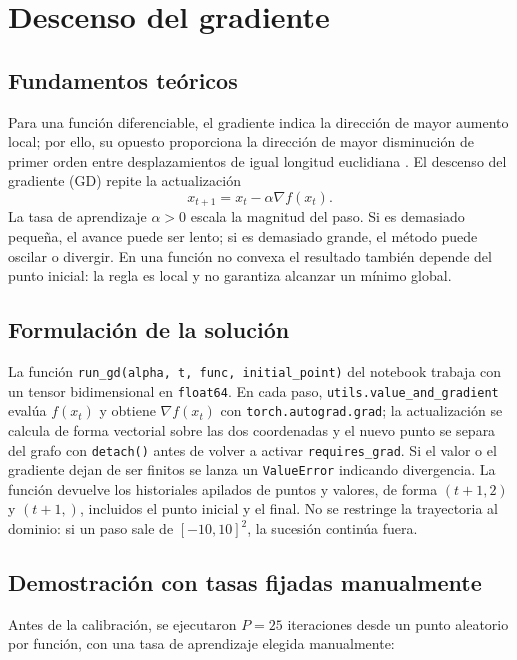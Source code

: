 \section{Descenso del gradiente}

\subsection{Fundamentos teóricos}

Para una función diferenciable, el gradiente indica la dirección de mayor
aumento local; por ello, su opuesto proporciona la dirección de mayor
disminución de primer orden entre desplazamientos de igual longitud
euclidiana \cite{nocedal2006numerical,ruder2016overview}. El descenso del
gradiente (GD) repite la actualización
\[
x_{t+1} = x_t - \alpha \nabla f(x_t).
\]
La tasa de aprendizaje $\alpha>0$ escala la magnitud del paso. Si es
demasiado pequeña, el avance puede ser lento; si es demasiado grande, el
método puede oscilar o divergir. En una función no convexa el resultado
también depende del punto inicial: la regla es local y no garantiza alcanzar
un mínimo global.

\subsection{Formulación de la solución}

La función \texttt{run\_gd(alpha, t, func, initial\_point)} del notebook
trabaja con un tensor bidimensional en \texttt{float64}. En cada paso,
\texttt{utils.value\_and\_gradient} evalúa $f(x_t)$ y obtiene $\nabla
f(x_t)$ con \texttt{torch.autograd.grad}; la actualización se calcula de
forma vectorial sobre las dos coordenadas y el nuevo punto se separa del
grafo con \texttt{detach()} antes de volver a activar
\texttt{requires\_grad}. Si el valor o el gradiente dejan de ser finitos se
lanza un \texttt{ValueError} indicando divergencia. La función devuelve los
historiales apilados de puntos y valores, de forma $(t+1,2)$ y $(t+1,)$,
incluidos el punto inicial y el final. No se restringe la trayectoria al
dominio: si un paso sale de $[-10,10]^2$, la sucesión continúa fuera.

\subsection{Demostración con tasas fijadas manualmente}
\label{sec:gd_aplicacion}

Antes de la calibración, se ejecutaron $P=25$ iteraciones desde un punto
aleatorio por función, con una tasa de aprendizaje elegida manualmente:

